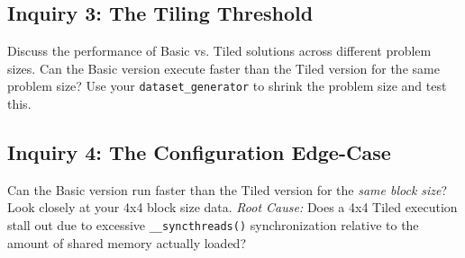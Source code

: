 \documentclass{article}
\begin{document}
\subsection*{Inquiry 3: The Tiling Threshold}
Discuss the performance of Basic vs. Tiled solutions across different problem sizes. Can the Basic version execute faster than the Tiled version for the same problem size? Use your \texttt{dataset\_generator} to shrink the problem size and test this.

\subsection*{Inquiry 4: The Configuration Edge-Case}
Can the Basic version run faster than the Tiled version for the \textit{same block size}? Look closely at your 4x4 block size data. \textit{Root Cause:} Does a 4x4 Tiled execution stall out due to excessive \texttt{\_\_syncthreads()} synchronization relative to the amount of shared memory actually loaded?
\end{document}
